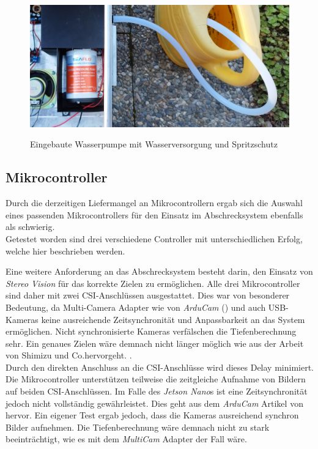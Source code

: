 \begin{figure}[H]
    \centering
    \includegraphics[width=\textwidth]{images/spritzschutz.jpg}
    \label{fig:Spritzschutz}
    \caption{Eingebaute Wasserpumpe mit Wasserversorgung und Spritzschutz}
\end{figure}

\subsection{Mikrocontroller}

Durch die derzeitigen Liefermangel an Mikrocontrollern ergab sich die Auswahl eines passenden Mikrocontrollers für den Einsatz im Abschrecksystem ebenfalls als schwierig.\\
Getestet worden sind drei verschiedene Controller mit unterschiedlichen Erfolg, welche hier beschrieben werden.

Eine weitere Anforderung an das Abschrecksystem besteht darin, den Einsatz von \textit{Stereo Vision} für das korrekte Zielen zu ermöglichen. Alle drei Mikrocontroller sind daher mit zwei \ac{CSI}-Anschlüssen ausgestattet. Dies war von besonderer Bedeutung, da Multi-Camera Adapter wie von \textit{ArduCam} (\cite{arducam_multicam}) und auch USB-Kameras keine ausreichende Zeitsynchronität und Anpassbarkeit an das System ermöglichen. Nicht synchronisierte Kameras verfälschen die Tiefenberechnung sehr. Ein genaues Zielen wäre demnach nicht länger möglich wie aus der Arbeit von Shimizu und Co.hervorgeht. \cite{time_delay_sv}.
\\
Durch den direkten Anschluss an die \ac{CSI}-Anschlüsse wird dieses Delay minimiert. Die Mikrocontroller unterstützen teilweise die zeitgleiche Aufnahme von Bildern auf beiden \ac{CSI}-Anschlüssen. Im Falle des \textit{Jetson Nano}s ist eine Zeitsynchronität jedoch nicht vollständig gewährleistet. Dies geht aus dem \textit{ArduCam} Artikel von \cite{arduCam_sync_b01} hervor. Ein eigener Test ergab jedoch, dass die Kameras ausreichend synchron Bilder aufnehmen. Die Tiefenberechnung wäre demnach nicht zu stark beeinträchtigt, wie es mit dem \textit{MultiCam} Adapter der Fall wäre.

